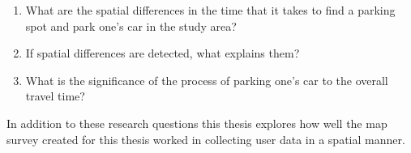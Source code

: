 \begin{spacing}{1}
\begin{enumerate}[label=\Roman*] %
  \item What are the spatial differences in the time that it takes to find a parking spot and park one’s car in the study area?
  \item If spatial differences are detected, what explains them?
  \item What is the significance of the process of parking one’s car to the overall travel time?
\end{enumerate}
\end{spacing}
\bigskip
In addition to these research questions this thesis explores how well the map survey created for this thesis worked in collecting user data in a spatial manner.